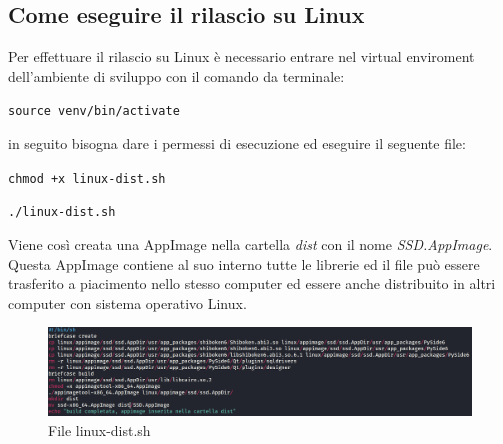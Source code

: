 \subsection{Come eseguire il rilascio su Linux}
Per effettuare il rilascio su Linux è necessario entrare nel virtual enviroment dell'ambiente di sviluppo con il comando da terminale:
\newline{}\centerline{\texttt{source venv/bin/activate}}\newline{}
in seguito bisogna dare i permessi di esecuzione ed eseguire il seguente file:
\newline{}\centerline{\texttt{chmod +x linux-dist.sh}}
\newline{}\centerline{\texttt{./linux-dist.sh}}\newline{}
Viene così creata una AppImage nella cartella \textit{dist} con il nome \textit{SSD.AppImage}. \\
Questa AppImage contiene al suo interno tutte le librerie ed il file può essere trasferito a piacimento nello stesso computer ed essere anche distribuito in altri computer con sistema operativo Linux.
\begin{figure}[H]
    \centering
    \includegraphics[scale = 0.2]{components/img/linux-deploy-script.png}
    \caption{File linux-dist.sh}
    \label{fig:File win-dist.bat}
\end{figure}

